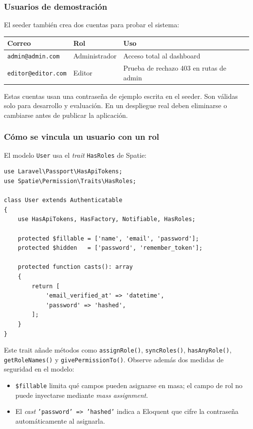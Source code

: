 \subsubsection{Usuarios de demostración}
El seeder también crea dos cuentas para probar el sistema:
\begin{center}
\begin{tabular}{lll}
\toprule
\textbf{Correo} & \textbf{Rol} & \textbf{Uso} \\
\midrule
\texttt{admin@admin.com} & Administrador & Acceso total al dashboard \\
\texttt{editor@editor.com} & Editor & Prueba de rechazo 403 en rutas de admin \\
\bottomrule
\end{tabular}
\end{center}
\begin{aviso}
Estas cuentas usan una contraseña de ejemplo escrita en el seeder. Son válidas solo para desarrollo y evaluación. En un despliegue real deben eliminarse o cambiarse antes de publicar la aplicación.
\end{aviso}

\subsubsection{Cómo se vincula un usuario con un rol}
El modelo \texttt{User} usa el \emph{trait} \texttt{HasRoles} de Spatie:
\begin{lstlisting}[caption={app/Models/User.php (fragmento)}]
use Laravel\Passport\HasApiTokens;
use Spatie\Permission\Traits\HasRoles;

class User extends Authenticatable
{
    use HasApiTokens, HasFactory, Notifiable, HasRoles;

    protected $fillable = ['name', 'email', 'password'];
    protected $hidden   = ['password', 'remember_token'];

    protected function casts(): array
    {
        return [
            'email_verified_at' => 'datetime',
            'password' => 'hashed',
        ];
    }
}
\end{lstlisting}
Este trait añade métodos como \texttt{assignRole()}, \texttt{syncRoles()}, \texttt{hasAnyRole()}, \texttt{getRoleNames()} y \texttt{givePermissionTo()}. Observe además dos medidas de seguridad en el modelo:
\begin{itemize}
    \item \texttt{\$fillable} limita qué campos pueden asignarse en masa; el campo de rol no puede inyectarse mediante \emph{mass assignment}.
    \item El \emph{cast} \texttt{'password' => 'hashed'} indica a Eloquent que cifre la contraseña automáticamente al asignarla.
\end{itemize}

